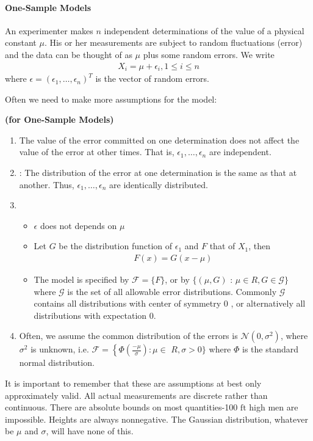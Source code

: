 \documentclass{article}
\newcommand{\bfs}[1]{\textbf{({#1}) }}
\begin{document}
\paragraph{One-Sample Models}
\begin{exma}\label{ex:onesample}
An experimenter makes $n$ independent determinations of the value of a physical constant $\mu$. His or her measurements are subject to random fluctuations (error) and the data can be thought of as  $\mu$ plus some random errors. We write
\begin{align*}
X_{i}=\mu+\epsilon_{i}, 1 \leq i \leq n
\end{align*}
where $\epsilon=\left(\epsilon_{1}, \ldots, \epsilon_{n}\right)^{T}$ is the vector of random errors. 
\end{exma} 
Often we need to make more assumptions for the model:
\begin{assuma}\bfs{for One-Sample Models}

\begin{enumerate}[(1).]
    \item {} The value of the error committed on one determination does not affect the value of the error at other times. That is, $\epsilon_{1}, \ldots, \epsilon_{n}$ are independent.
    \item {}: The distribution of the error at one determination is the same as that at another. Thus, $\epsilon_{1}, \ldots, \epsilon_{n}$ are identically distributed.
\item 
{} 
\begin{itemize}
\item $\epsilon$ does not depends on $\mu$
    \item Let $G$ be the distribution function of $\epsilon_{1}$ and $F$ that of $X_{1}$, then
\begin{align*}
F(x)=G(x-\mu)
\end{align*}
\item The model is specified by $\mathcal{F}=\{F\}$, or by $\{(\mu, G)$ : $\mu \in R, G \in \mathcal{G}\}$ where $\mathcal{G}$ is the set of all allowable error distributions. Commonly  $\mathcal{G}$ contains all distributions with center of symmetry $0$ , or alternatively all distributions with expectation $0$. 
\end{itemize}
\item {}  
Often, we assume the common distribution of the errors is $\mathcal{N}\left(0, \sigma^{2}\right)$, where $\sigma^{2}$ is unknown, i.e. $\mathcal{F}=\left\{\Phi\left(\frac{-\mu}{\sigma}\right): \mu \in\right.$ $R, \sigma>0\}$ where $\Phi$ is the standard normal distribution.

\end{enumerate}
\end{assuma}
\begin{rema}
It is important to remember that these are assumptions at best only approximately valid. All actual measurements are discrete rather than continuous. There are absolute bounds on most quantities-100 $\mathrm{ft}$ high men are impossible. Heights are always nonnegative. The Gaussian distribution, whatever be $\mu$ and $\sigma$, will have none of this.
\end{rema}
\end{document}
